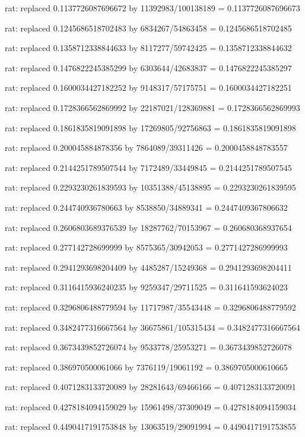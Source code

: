 \documentclass[a4paper,10pt]{article}
\begin{document}
\begin{eulernotebook}
\begin{eulercomment}
\begin{eulercomment}
\begin{eulercomment}
\begin{eulercomment}
\begin{eulercomment}
\begin{eulercomment}
\begin{eulercomment}
\begin{eulercomment}
\begin{eulercomment}
\begin{eulercomment}
\begin{eulercomment}
\begin{eulercomment}
\begin{eulercomment}
\begin{eulercomment}
\begin{eulercomment}
\begin{eulercomment}
\begin{euleroutput}
  rat: replaced 0.1137726087696672 by 11392983/100138189 = 0.1137726087696673
  
  rat: replaced 0.1245686518702483 by 6834267/54863458 = 0.1245686518702485
  
  rat: replaced 0.1358712338844633 by 8117277/59742425 = 0.1358712338844632
  
  rat: replaced 0.1476822245385299 by 6303644/42683837 = 0.1476822245385297
  
  rat: replaced 0.1600034427182252 by 9148317/57175751 = 0.1600034427182251
  
  rat: replaced 0.1728366562869992 by 22187021/128369881 = 0.1728366562869993
  
  rat: replaced 0.1861835819091898 by 17269805/92756863 = 0.1861835819091898
  
  rat: replaced 0.200045884878356 by 7864089/39311426 = 0.2000458848783557
  
  rat: replaced 0.2144251789507544 by 7172489/33449845 = 0.2144251789507545
  
  rat: replaced 0.2293230261839593 by 10351388/45138895 = 0.2293230261839595
  
  rat: replaced 0.244740936780663 by 8538850/34889341 = 0.2447409367806632
  
  rat: replaced 0.2606803689376539 by 18287762/70153967 = 0.260680368937654
  
  rat: replaced 0.277142728699999 by 8575365/30942053 = 0.2771427286999993
  
  rat: replaced 0.2941293698204409 by 4485287/15249368 = 0.2941293698204411
  
  rat: replaced 0.3116415936240235 by 9259347/29711525 = 0.311641593624023
  
  rat: replaced 0.3296806488779594 by 11717987/35543448 = 0.3296806488779592
  
  rat: replaced 0.3482477316667564 by 36675861/105315434 = 0.3482477316667564
  
  rat: replaced 0.3673439852726074 by 9533778/25953271 = 0.3673439852726078
  
  rat: replaced 0.386970500061066 by 7376119/19061192 = 0.3869705000610665
  
  rat: replaced 0.4071283133720089 by 28281643/69466166 = 0.4071283133720091
  
  rat: replaced 0.4278184094159029 by 15961498/37309049 = 0.4278184094159034
  
  rat: replaced 0.4490417191753848 by 13063519/29091994 = 0.4490417191753855
  

\end{euleroutput}
\end{eulercomment}
\end{eulercomment}
\end{eulercomment}
\end{eulercomment}
\end{eulercomment}
\end{eulercomment}
\end{eulercomment}
\end{eulercomment}
\end{eulercomment}
\end{eulercomment}
\end{eulercomment}
\end{eulercomment}
\end{eulercomment}
\end{eulercomment}
\end{eulercomment}
\end{eulercomment}
\end{eulernotebook}
\end{document}
